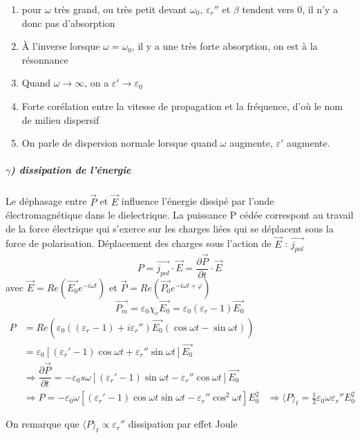 \documentclass[12pt,a4paper]{report}
\begin{document}
\begin{enumerate}
	\item pour \(\omega\) très grand, ou très petit devant \(\omega_0\), \(\varepsilon_r'' \) et \(\beta\) tendent vers 0, il n'y a donc pas d'absorption
	\item À l'inverse lorsque \(\omega = \omega_0\), il y a une très forte absorption, on est à la résonnance
	\item Quand \(\omega \rightarrow \infty\), on a \(\varepsilon' \rightarrow \varepsilon_0\)
	\item Forte corélation entre la vitesse de propagation et la fréquence, d'où le nom de milieu dispersif
	\item On parle de dispersion normale lorsque quand \(\omega\) augmente, \(\varepsilon'\) augmente.
\end{enumerate}

\subparagraph{\(\gamma\)) dissipation de l'énergie}

Le déphasage entre \(\vec{P}\) et \(\vec{E}\) influence l'énergie dissipé par l'onde électromagnétique dans le dielectrique.
La puissance P cédée correspont au travail de la force électrique qui s'exerce sur les charges liées qui se déplacent sous la force de polarisation.
Déplacement des charges sous l'action de \(\vec{E}\) : \(\vec{j_{pol}}\)
\[
	P = \vec{j_{pol}} \cdot \vec{E} = \dfrac{\partial \vec{P}}{\partial t} \cdot \vec{E}
\]
avec \(\vec{E} = Re\left( \vec{E_0} e^{-i\omega t}\right)\) et \(\vec{P} = Re\left( \vec{P_0} e^{-i\omega t + \varphi}\right)\)
\[
	\vec{P_m} = \varepsilon_0 \chi_e \vec{E_0} = \varepsilon_0 ( \varepsilon_r - 1) \vec{E_0}
\]
\begin{align*}
	P &= Re\left( \varepsilon_0 (( \varepsilon_r - 1) + i \varepsilon_r'') \vec{E_0} (\cos \omega t - \sin \omega t) \right)\\
	&= \varepsilon_0 \left[ (\varepsilon_r' - 1)\cos \omega t + \varepsilon_r'' \sin \omega t \right] \vec{E_0}\\
	&\Rightarrow \dfrac{\partial \vec{P}}{\partial t} = -\varepsilon_0s \omega \left[ (\varepsilon_r' - 1) \sin \omega t - \varepsilon_r'' \cos \omega t\right] \vec{E_0}\\
	&\Rightarrow P = - \varepsilon_0 \omega \left[ (\varepsilon_r' - 1) \cos \omega t \sin \omega t - \varepsilon_r'' \cos^2 \omega t\right] E_0^2
	&\Rightarrow \langle P \rangle_t = \frac{1}{2} \varepsilon_0 \omega \varepsilon_r'' E_0^2
\end{align*}

On remarque que \(\langle P \rangle_t \propto \varepsilon_r''\) dissipation par effet Joule
\end{document}
